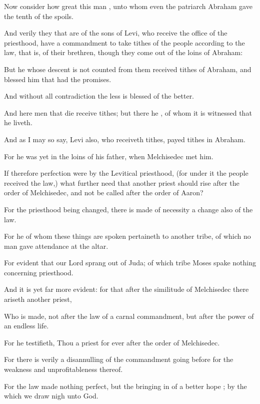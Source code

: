 {Now
consider how
great this
man
{}, unto
whom
even the
patriarch
Abraham
gave the
tenth
of the
spoils.

And
verily they that
are
of the
sons of
Levi, who
receive the office of the
priesthood,
have a
commandment to take tithes
of the
people according
to the
law,
that
is,
of
their
brethren,
though they come
out
of the
loins of
Abraham:

But he whose descent
is
not
counted
from
them received
tithes of
Abraham,
and
blessed him that
had the
promises.

And
without
all
contradiction the
less is
blessed
of the
better.

And
here
men that
die
receive
tithes;
but
there
he
{}, of whom it is
witnessed
that he
liveth.

And
as I may so
say,
Levi
also, who
receiveth
tithes, payed
tithes
in
Abraham.

For he
was
yet
in the
loins of his
father,
when
Melchisedec
met
him.

If
therefore
perfection
were
by the
Levitical
priesthood, (for
under
it the
people received the
law,)
what
further
need
{}
that
another
priest should
rise
after the
order of
Melchisedec,
and
not be
called
after the
order of
Aaron?

For the
priesthood being
changed, there is
made
of
necessity a
change
also of the
law.

For
he
of
whom these
things are
spoken
pertaineth
to
another
tribe,
of
which no
man gave
attendance at the
altar.

For
{}
evident
that
our
Lord
sprang out
of
Juda;
of
which
tribe
Moses
spake
nothing
concerning
priesthood.

And it
is
yet far
more
evident: for
that
after the
similitude of
Melchisedec there
ariseth
another
priest,

Who is
made,
not
after the
law of
a
carnal
commandment,
but
after the
power of
an
endless
life.

For he
testifieth,
Thou
{} a
priest
for
ever
after the
order of
Melchisedec.

For there
is
verily a
disannulling of the
commandment going
before
for the
weakness
and
unprofitableness
thereof.

For the
law
made
nothing
perfect,
but the bringing
in of
a
better
hope
{};
by the
which we draw
nigh unto
God.

}
